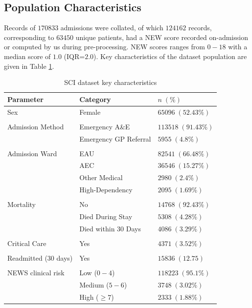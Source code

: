 \documentclass[10pt,journal, compsoc]{IEEEtran}
\begin{document}
\subsection{Population Characteristics} Records of $170833$ admissions were collated, of which $124162$ records, corresponding to $63450$ unique patients, had a NEW score recorded on-admission or computed by us during pre-processing. NEW scores ranges from $0-18$ with a median score of $1.0$ (IQR=$2.0$). Key characteristics of the dataset population are given in Table \ref{tab:population}.

\begin{table}[!t]
    \renewcommand{\arraystretch}{1.3}
    \centering
    \caption{SCI dataset key characteristics}
    \label{tab:population}
    \begin{tabular}{l l l}
        \toprule
        Parameter            & Category              & $n\;(\%)$           \\
        \midrule
        Sex                  & Female                & $65096\;(52.43\%)$  \\\\
        Admission Method     & Emergency A\&E        & $113518\;(91.43\%)$ \\
                             & Emergency GP Referral & $5955\;(4.8\%)$     \\\\
        Admission Ward       & EAU                   & $82541\;(66.48\%)$  \\
                             & AEC                   & $36546\;(15.27\%)$  \\
                             & Other Medical         & $2980\;(2.4\%)$     \\
                             & High-Dependency       & $2095\;(1.69\%)$    \\\\
        Mortality            & No                    & $14768\;(92.43\%)$  \\
                             & Died During Stay      & $5308\;(4.28\%)$    \\
                             & Died within 30 Days   & $4086\;(3.29\%)$    \\\\
        Critical Care        & Yes                   & $4371\;(3.52\%)$    \\\\
        Readmitted (30 days) & Yes                   & $15836\;(12.75)$    \\\\
        NEWS clinical risk   & Low ($0-4$)           & $118223\;(95.1\%)$  \\
                             & Medium ($5-6$)        & $3748\;(3.02\%)$    \\
                             & High ($\geq 7$)       & $2333\;(1.88\%)$    \\
        \bottomrule
    \end{tabular}
\end{table}
\end{document}
